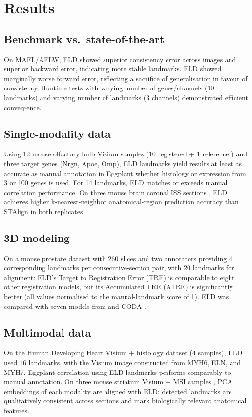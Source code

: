 \documentclass[11pt]{article}
\begin{document}
\section{Results}
\subsection{Benchmark vs.\ state-of-the-art}
On MAFL/AFLW, ELD showed superior consistency error across images and superior backward error, indicating more stable landmarks. ELD showed marginally worse forward error, reflecting a sacrifice of generalisation in favour of consistency. Runtime tests with varying number of genes/channels (10 landmarks) and varying number of landmarks (3 channels) demonstrated efficient convergence.

\subsection{Single-modality data}
Using 12 mouse olfactory bulb Visium samples (10 registered + 1 reference \citep{r13}) and three target genes (Nrgn, Apoe, Omp), ELD landmarks yield results at least as accurate as manual annotation in Eggplant whether histology or expression from 3 or 100 genes is used. For 14 landmarks, ELD matches or exceeds manual correlation performance. On three mouse brain coronal ISS sections \citep{r14}, ELD achieves higher k-nearest-neighbor anatomical-region prediction accuracy than STAlign \citep{r15} in both replicates.

\subsection{3D modeling}
On a mouse prostate dataset with 260 slices \citep{r16} and two annotators providing 4 corresponding landmarks per consecutive-section pair, with 20 landmarks for alignment: ELD's Target to Registration Error (TRE) is comparable to eight other registration models, but its Accumulated TRE (ATRE) is significantly better (all values normalised to the manual-landmark score of 1). ELD was compared with seven models from \citep{r16} and CODA \citep{r17}.

\subsection{Multimodal data}
On the Human Developing Heart Visium + histology dataset \citep{r13} (4 samples), ELD used 16 landmarks, with the Visium image constructed from MYH6, ELN, and MYH7. Eggplant correlation using ELD landmarks performs comparably to manual annotation. On three mouse striatum Visium + MSI samples \citep{r18}, PCA embeddings of each modality are aligned with ELD; detected landmarks are qualitatively consistent across sections and mark biologically relevant anatomical features.
\end{document}

